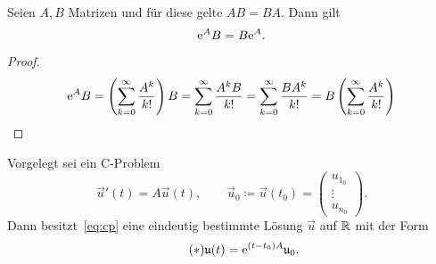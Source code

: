 \begin{lemma}\label{thm:matrixexp-commute}
    Seien $A,B$ Matrizen und für diese gelte $AB = BA$.
    Dann gilt
    \begin{equation*}
        \mathrm{e}^A B = B \mathrm{e}^A.
    \end{equation*}
\end{lemma}

\begin{proof}
    \begin{equation*}
        \mathrm{e}^A B = \left( \sum^\infty_{k=0} \frac{A^k}{k!} \right) B
        = \sum^\infty_{k=0} \frac{A^k B}{k!}
        = \sum^\infty_{k=0} \frac{B A^k}{k!}
        = B \left( \sum^\infty_{k=0} \frac{A^k}{k!} \right)
    \end{equation*}
\end{proof}

\begin{theorem}\label{thm:existenz-eindeutigkeit}
    Vorgelegt sei ein C-Problem
    \begin{equation}\tag{CP}\label{eq:cp}
        \vec{u}'(t) = A \vec{u}(t), \qquad \vec{u}_0 \coloneqq \vec{u}(t_0) = \begin{pmatrix} u_{1_0}\\ \vdots\\ u_{n_0} \end{pmatrix}.
    \end{equation}
    Dann besitzt~\eqref{eq:cp} eine eindeutig bestimmte Lösung $\vec{u}$ auf $\mathbb{R}$ mit der Form
    \begin{equation}\tag{$\ast$}\label{eq:solution}
        \mathfrak{u}(t) = \mathrm{e}^{(t - t_0) A} \mathfrak{u}_0.
    \end{equation}
\end{theorem}

